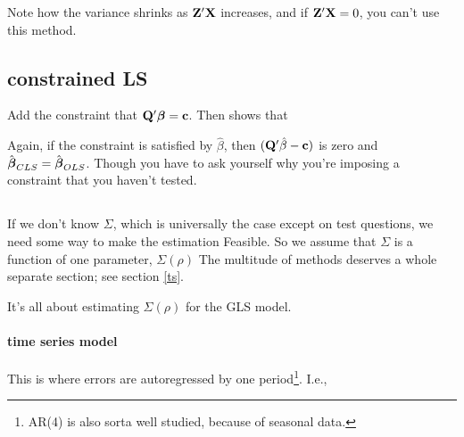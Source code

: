 
Note how the variance shrinks as ${\bf Z}'{\bf X}$ increases, and if
${\bf Z}'{\bf X}=0$, you can't use this method.

\subsection{constrained LS }

Add the constraint that ${\bf Q}'{\mbox{\boldmath$\beta$}}={\bf c}$. Then \cite{amemiya:ez}
shows that 


Again, if the constraint is satisfied by $\hat\beta$, then
$({\bf Q}'\hat\beta-{\bf c})$ is zero and $\hat{{\mbox{\boldmath$\beta$}}}_{CLS}=\hat{{\mbox{\boldmath$\beta$}}}_{OLS}$.
Though you have to ask yourself why you're imposing a constraint that
you haven't tested.



\subsection{}

If we don't know $\Sigma$, which is universally the case except on
test questions, we need some way to make the estimation Feasible. So we
assume that $\Sigma$ is a function of one parameter, $\Sigma(\rho)$ The
multitude of methods deserves a whole separate section; see section \ref{ts}.

\label{ts}

It's all about estimating $\Sigma(\rho)$ for the GLS model. 

\paragraph{ time series model}

This is where errors are autoregressed by one period\footnote{AR(4) is
also sorta well studied, because of seasonal data.}. I.e.,

